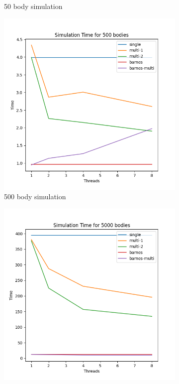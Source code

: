 \documentclass[12pt]{article}
\begin{document}
\begin{figure}[hbt!]
\begin{subfigure}[b]{0.41\textwidth}
        \caption{50 body simulation}
        \label{figure:50-body}
    \end{subfigure}
    \hfill
    \begin{subfigure}[b]{0.41\textwidth}
        \centering
        \includegraphics[width=\textwidth]{simulation/simulation_time_500.png}
        \caption{500 body simulation}
        \label{figure:500-body}
    \end{subfigure}
    \hfill
    \begin{subfigure}[b]{0.41\textwidth}
        \centering
        \includegraphics[width=\textwidth]{simulation/simulation_time_5000.png}

\end{subfigure}
\end{figure}
\end{document}
